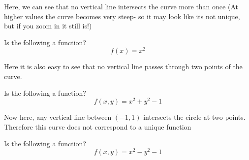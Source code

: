 \documentclass[a4paper]{article}
\begin{document}
Here, we can see that no vertical line intersects the curve more than once (At higher values the curve becomes very steep- so it may look like its not unique, but if you zoom in it still is!)

\begin{question}{}{}
Is the following a function?
\[
f(x) = x^2
\]
\end{question} 
\begin{center}
\end{center}


Here it is also easy to see that no vertical line passes through two points of the curve.


\begin{question}{}{}
Is the following a function?
\[
f(x,y) = x^2 + y^2 - 1
\]
\end{question}

\begin{center}
\end{center}

Now here, any vertical line between \((-1, 1)\) intersects the circle at two points. Therefore this curve does not correspond to a unique function

\begin{question}{}{}
Is the following a function?
\[
f(x,y) = x^2 - y^2 - 1
\]
\end{question}

\begin{center}
\end{center}
\end{document}
